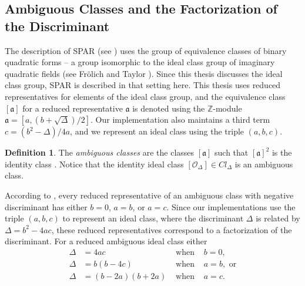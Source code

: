 \documentclass{ucalgthes1}
\theoremstyle{definition}
\newtheorem{defn}[thm]{Definition}
\newcommand{\ZZ}{\mathbb{Z}}
\begin{document}
\subsection{Ambiguous Classes and the Factorization of the Discriminant}
\label{subsec:forms}


The description of SPAR (see \cite{Schnorr1984}) uses the group of equivalence classes of binary quadratic forms -- a group isomorphic to the ideal class group of imaginary quadratic fields (see Fr{\"o}lich and Taylor \cite{Frolich1993}).  Since this thesis discusses the ideal class group, SPAR is described in that setting here.  This thesis uses reduced representatives for elements of the ideal class group, and the equivalence class $[\mathfrak a]$ for a reduced representative $\mathfrak a$ is denoted using the $\ZZ$\mbox{-}module $\mathfrak a = [a, (b + \sqrt\Delta)/2]$.  Our implementation also maintains a third term $c = (b^2 - \Delta)/4a$, and we represent an ideal class using the triple $(a, b, c)$.

\begin{defn}
The \emph{ambiguous classes} are the classes $[\mathfrak a]$ such that ${[\mathfrak a]}^2$ is the identity class \cite[p.302]{Schnorr1984}.  Notice that the identity ideal class $[\mathcal O_\Delta] \in Cl_\Delta$ is an ambiguous class.
\end{defn}

According to \cite[p.303]{Schnorr1984}, every reduced representative of an ambiguous class with negative discriminant has either $b = 0$, $a = b$, or $a = c$.  Since our implementations use the triple $(a, b, c)$ to represent an ideal class, where the discriminant $\Delta$ is related by $\Delta = b^2 - 4ac$, these reduced representatives correspond to a factorization of the discriminant.  For a reduced ambiguous ideal class either
\begin{align*}
	\Delta &= 4ac & \textrm{ when } & b = 0, \\
	\Delta &= b(b-4c) & \textrm{ when } & a = b, \textrm{ or} \\
	\Delta &= (b - 2a)(b + 2a) & \textrm{ when } & a = c.
\end{align*}
\end{document}
